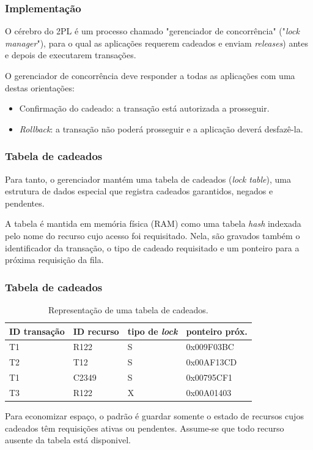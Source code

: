 \documentclass{beamer}
\begin{document}

\begin{frame}
    \frametitle{Implementação}

    O cérebro do 2PL é um processo chamado "gerenciador de concorrência" ("\emph{lock manager}"), para o qual as aplicações requerem cadeados e enviam \emph{releases}) antes e depois de executarem transações.

    \medskip
    O gerenciador de concorrência deve responder a todas as aplicações com uma destas orientações:

    \begin{itemize}
        \item Confirmação do cadeado: a transação está autorizada a prosseguir.
        \item \emph{Rollback}: a transação não poderá prosseguir e a aplicação deverá desfazê-la.
    \end{itemize}
\end{frame}


\begin{frame}
    \frametitle{Tabela de cadeados}
    Para tanto, o gerenciador mantém uma tabela de cadeados (\emph{lock table}), uma estrutura de dados especial que registra cadeados garantidos, negados e pendentes.

    \medskip
    A tabela é mantida em memória física (RAM) como uma tabela \emph{hash} indexada pelo nome do recurso cujo acesso foi requisitado. Nela, são gravados também o identificador da transação, o tipo de cadeado requisitado e um ponteiro para a próxima requisição da fila.
\end{frame}

\begin{frame}
    \frametitle{Tabela de cadeados}

    \begin{table}
    \begin{tabular}{l l l l}
        \toprule

        \textbf{ID transação} & \textbf{ID recurso} & \textbf{tipo de \emph{lock}} & \textbf{ponteiro próx.}\\

        \midrule

        T1 & R122 & S & 0x009F03BC \\
        T2 & T12 & S & 0x00AF13CD \\
        T1 & C2349 & S & 0x00795CF1 \\
        T3 & R122 & X & 0x00A01403 \\

        \bottomrule
    \end{tabular}
    \caption{Representação de uma tabela de cadeados.}
    \end{table}

    \medskip
    Para economizar espaço, o padrão é guardar somente o estado de recursos cujos cadeados têm requisições ativas ou pendentes. Assume-se que todo recurso ausente da tabela está disponivel.
\end{frame}
    
\end{document}
